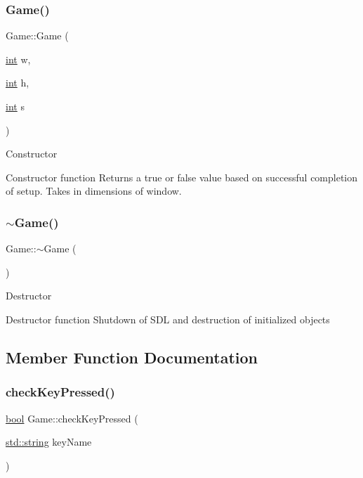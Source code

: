 \subsubsection{\texorpdfstring{Game()}{Game()}}
{\footnotesize\ttfamily Game\+::\+Game (\begin{DoxyParamCaption}\item[{\mbox{\hyperlink{warnings_8h_a74f207b5aa4ba51c3a2ad59b219a423b}{int}}}]{w,  }\item[{\mbox{\hyperlink{warnings_8h_a74f207b5aa4ba51c3a2ad59b219a423b}{int}}}]{h,  }\item[{\mbox{\hyperlink{warnings_8h_a74f207b5aa4ba51c3a2ad59b219a423b}{int}}}]{s }\end{DoxyParamCaption})}

Constructor

Constructor function Returns a true or false value based on successful completion of setup. Takes in dimensions of window. \mbox{\label{class_game_ae3d112ca6e0e55150d2fdbc704474530}} 
\subsubsection{\texorpdfstring{$\sim$Game()}{~Game()}}
{\footnotesize\ttfamily Game\+::$\sim$\+Game (\begin{DoxyParamCaption}{ }\end{DoxyParamCaption})}

Destructor

Destructor function Shutdown of S\+DL and destruction of initialized objects 

\subsection{Member Function Documentation}
\mbox{\label{class_game_ac0e29588db21270fc613a2e2b6a209c5}} 
\subsubsection{\texorpdfstring{checkKeyPressed()}{checkKeyPressed()}}
{\footnotesize\ttfamily \mbox{\hyperlink{asdl_8h_af6a258d8f3ee5206d682d799316314b1}{bool}} Game\+::check\+Key\+Pressed (\begin{DoxyParamCaption}\item[{\mbox{\hyperlink{_s_d_l__opengl__glext_8h_ab4ccfaa8ab0e1afaae94dc96ef52dde1}{std\+::string}}}]{key\+Name }\end{DoxyParamCaption})}


